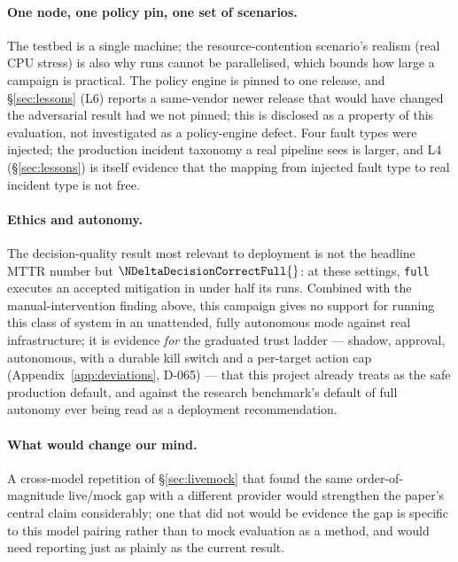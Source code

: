 \paragraph{One node, one policy pin, one set of scenarios.}
The testbed is a single machine; the resource-contention scenario's realism (real CPU stress) is
also why runs cannot be parallelised, which bounds how large a campaign is practical. The policy
engine is pinned to one release, and \S\ref{sec:lessons} (L6) reports a same-vendor newer release
that would have changed the adversarial result had we not pinned; this is disclosed as a property of
this evaluation, not investigated as a policy-engine defect. Four fault types were injected; the
production incident taxonomy a real pipeline sees is larger, and L4 (\S\ref{sec:lessons}) is itself
evidence that the mapping from injected fault type to real incident type is not free.

\paragraph{Ethics and autonomy.}
The decision-quality result most relevant to deployment is not the headline MTTR number but
$\NDeltaDecisionCorrectFull{}$: at these settings, \texttt{full} executes an accepted mitigation in
under half its runs. Combined with the manual-intervention finding above, this campaign gives no
support for running this class of system in an unattended, fully autonomous mode against real
infrastructure; it is evidence \emph{for} the graduated trust ladder --- shadow, approval, autonomous,
with a durable kill switch and a per-target action cap (Appendix~\ref{app:deviations}, D-065) --- that
this project already treats as the safe production default, and against the research benchmark's
default of full autonomy ever being read as a deployment recommendation.

\paragraph{What would change our mind.}
A cross-model repetition of \S\ref{sec:livemock} that found the same order-of-magnitude live/mock gap
with a different provider would strengthen the paper's central claim considerably; one that did not
would be evidence the gap is specific to this model pairing rather than to mock evaluation as a
method, and would need reporting just as plainly as the current result.
